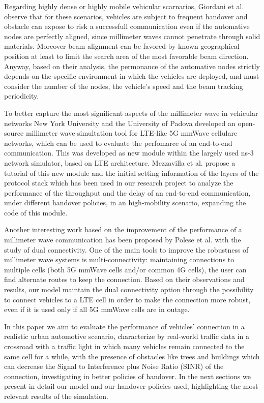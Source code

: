 \documentclass[conference,10pt]{IEEEtran}
\begin{document}
Regarding highly dense or highly mobile vehicular scarnarios, Giordani et al. \cite{mmvehicle} observe that for these scenarios, vehicles are subject to frequent handover and obstacle can expose to risk a successfull communication even if the automative nodes are perfectly aligned, since millimeter waves cannot penetrate through solid materials. Moreover beam alignment can be favored by known geographical position at least to limit the search area of the most favorable beam direction. Anyway, based on their analysis, the permonance of the automative nodes strictly depends on the specific environment in which the vehicles are deployed, and must consider the number of the nodes, the vehicle's speed and the beam tracking periodicity.

To better capture the most significant aspects of the millimeter wave in vehicular networks  New York University and the University of Padova developed an open-source millimeter wave simultation tool for LTE-like 5G mmWave cellulare networks, which can be used to evaluate the perfomarce of an end-to-end communication. This was developed as new module within the largely used ns-3 network simulator, based on LTE architecture. Mezzavilla et al. \cite{e2esim} propose a tutorial of this new module and the initial setting information of the layers of the protocol stack which has been used in our research project to analyze the performance of the throughput and the delay of an end-to-end communication, under different handover policies, in an high-mobility scenario, expanding the code of this module.

Another interesting work based on the improvement of the performance of a millimeter wave communication has been proposed by Polese et al. \cite{imphand} with the study of dual connectivity. One of the main tools to improve the robustness of millimeter wave systems is multi-connectivity: maintaining connections to multiple cells (both 5G mmWave cells and/or 	common 4G cells), the user can find alternate routes to keep the connection.
Based on their observations and results, our model maintain the dual connectivity option through the possibility to connect vehicles to a LTE cell in order to make the connection more robust, even if it is used only if all 5G mmWave cells are in outage.

In this paper we aim to evaluate the performance of vehicles' connection in a realistic urban automotive scenario, characterize by real-world traffic data in a crossroad with a traffic light in which many vehicles remain connected to the same cell for a while, with the presence of obstacles like trees and buildings which can decrease the Signal to Interference plus Noise Ratio (SINR) of the connection, investigating in better policies of handover.
In the next sections we present in detail our model and our handover policies used, highlighting the most relevant results of the simulation.
\end{document}
